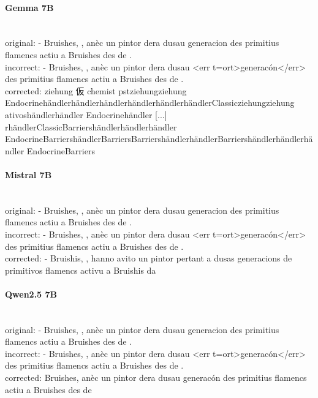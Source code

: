 \paragraph{Gemma 7B}~\\
{original:} - Bruishes, , anèc un pintor dera dusau generacion des primitius flamencs actiu a Bruishes des de .\\
{incorrect:} - Bruishes, , anèc un pintor dera dusau {\textless}err t=ort{\textgreater}generacón{\textless}/err{\textgreater} des primitius flamencs actiu a Bruishes des de .\\
{corrected:} ziehung 仮 chemist pstziehungziehung EndocrinehändlerhändlerhändlerhändlerhändlerhändlerClassicziehungziehung ativoshändlerhändler Endocrinehändler [...] rhändlerClassicBarriershändlerhändlerhändler EndocrineBarriershändlerBarriersBarriershändlerhändlerBarriershändlerhändlerhändler EndocrineBarriers\\

\paragraph{Mistral 7B}~\\
{original:} - Bruishes, , anèc un pintor dera dusau generacion des primitius flamencs actiu a Bruishes des de .\\
{incorrect:} - Bruishes, , anèc un pintor dera dusau {\textless}err t=ort{\textgreater}generacón{\textless}/err{\textgreater} des primitius flamencs actiu a Bruishes des de .\\
{corrected:} - Bruishis, , hanno avito un pintor pertant a dusas generacions de primitivos flamencs activu a Bruishis da\\

\paragraph{Qwen2.5 7B}~\\
{original:} - Bruishes, , anèc un pintor dera dusau generacion des primitius flamencs actiu a Bruishes des de .\\
{incorrect:} - Bruishes, , anèc un pintor dera dusau {\textless}err t=ort{\textgreater}generacón{\textless}/err{\textgreater} des primitius flamencs actiu a Bruishes des de .\\
{corrected:} Bruishes, anèc un pintor dera dusau generacón des primitius flamencs actiu a Bruishes des de\\

